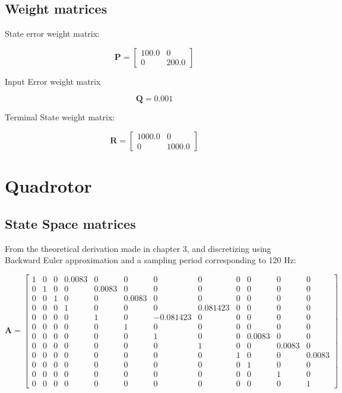 \subsection{Weight matrices}

State error weight matrix:

\begin{equation*}
\mathbf{P} = \begin{bmatrix} 100.0 & 0 \\ 0 & 200.0 \end{bmatrix}
\end{equation*} 

Input Error weight matrix

\begin{equation*}
\mathbf{Q} = 0.001
\end{equation*} 

Terminal State weight matrix:

\begin{equation*}
\mathbf{R} = \begin{bmatrix} 1000.0 & 0 \\ 0 & 1000.0 \end{bmatrix}
\end{equation*} 

\section{Quadrotor}

\subsection{State Space matrices}

From the theoretical derivation made in chapter 3, and discretizing using Backward Euler approximation and a sampling period corresponding to 120 Hz:

\begin{equation*}
\mathbf{A} = \begin{bmatrix} 1 & 0 & 0 & 0.0083 & 0 & 0 & 0 & 0 & 0 & 0 & 0 & 0 \\
0 & 1 & 0 & 0 & 0.0083 & 0 & 0 & 0 & 0 & 0 & 0 & 0 \\
0 & 0 & 1 & 0 & 0 & 0.0083 & 0 & 0 & 0 & 0 & 0 & 0 \\
0 & 0 & 0 & 1 & 0 & 0 & 0 & 0.081423 & 0 & 0 & 0 & 0 \\
0 & 0 & 0 & 0 & 1 & 0 & -0.081423 & 0 & 0 & 0 & 0 & 0 \\
0 & 0 & 0 & 0 & 0 & 1 & 0 & 0 & 0 & 0 & 0 & 0 \\
0 & 0 & 0 & 0 & 0 & 0 & 1 & 0 & 0 & 0.0083 & 0 & 0 \\
0 & 0 & 0 & 0 & 0 & 0 & 0 & 1 & 0 & 0 & 0.0083 & 0 \\
0 & 0 & 0 & 0 & 0 & 0 & 0 & 0 & 1 & 0 & 0 & 0.0083 \\
0 & 0 & 0 & 0 & 0 & 0 & 0 & 0 & 0 & 1 & 0 & 0 \\
0 & 0 & 0 & 0 & 0 & 0 & 0 & 0 & 0 & 0 & 1 & 0 \\
0 & 0 & 0 & 0 & 0 & 0 & 0 & 0 & 0 & 0 & 0 & 1 \end{bmatrix}
\end{equation*}

